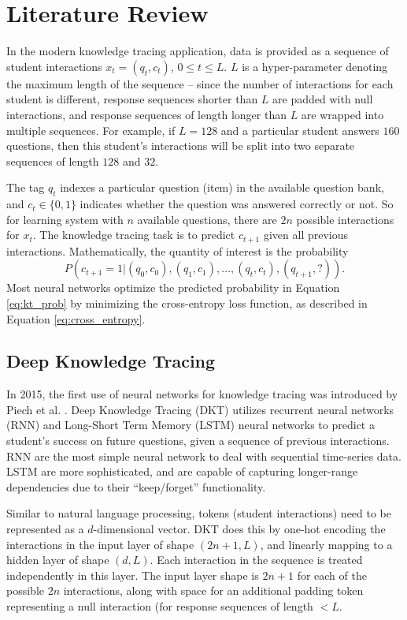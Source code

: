 \section{Literature Review}\label{sec:kt_lit}
In the modern knowledge tracing application, data is provided as a sequence of student interactions $x_t = (q_t, c_t)$, $0 \leq t \leq L$. $L$ is a hyper-parameter denoting the maximum length of the sequence -- since the number of interactions for each student is different, response sequences shorter than $L$ are padded with null interactions, and response sequences of length longer than $L$ are wrapped into multiple sequences. For example, if $L=128$ and a particular student answers $160$ questions, then this student's interactions will be split into two separate sequences of length $128$ and $32$.

The tag $q_t$ indexes a particular question (item) in the available question bank, and $c_t \in\{0,1\}$ indicates whether the question was answered correctly or not. So for learning system with $n$ available questions, there are $2n$ possible interactions for $x_t$. The knowledge tracing task is to predict $c_{t+1}$ given all previous interactions. Mathematically, the quantity of interest is the probability 
\begin{equation}
  P(c_{t+1} = 1 | (q_0,c_0), (q_1,c_1),\ldots,(q_t, c_t), (q_{t+1}, ?)).
  \label{eq:kt_prob}
\end{equation}
Most neural networks optimize the predicted probability in Equation \ref{eq:kt_prob} by  minimizing the cross-entropy loss function, as described in Equation \ref{eq:cross_entropy}.

\subsection{Deep Knowledge Tracing}
In 2015, the first use of neural networks for knowledge tracing was introduced by Piech et al. \cite{piech2015}. Deep Knowledge Tracing (DKT) utilizes recurrent neural networks (RNN) and Long-Short Term Memory (LSTM) neural networks to predict a student's success on future questions, given a sequence of previous interactions. RNN are the most simple neural network to deal with sequential time-series data. LSTM are more sophisticated, and are capable of capturing longer-range dependencies due to their ``keep/forget'' functionality. %

Similar to natural language processing, tokens (student interactions) need to be represented as a $d$-dimensional vector. DKT does this by one-hot encoding the interactions in the input layer of shape $(2n+1, L)$,  and linearly mapping to a hidden layer of shape $(d, L)$. Each interaction in the sequence is treated independently in this layer. The input layer shape is $2n+1$ for each of the possible $2n$ interactions, along with space for an additional padding token representing a null interaction (for response sequences of length $< L$.

